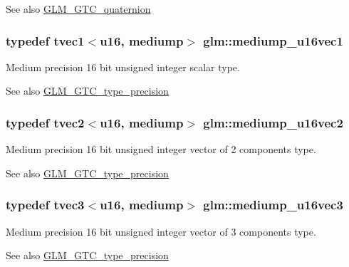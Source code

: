 \begin{DoxySeeAlso}{See also}
\hyperlink{group__gtc__quaternion}{G\+L\+M\+\_\+\+G\+T\+C\+\_\+quaternion} 
\end{DoxySeeAlso}
\hypertarget{namespaceglm_a425c296693be47183ee5fb01eca35cef}{}
\subsubsection[{mediump\+\_\+u16vec1}]{\setlength{\rightskip}{0pt plus 5cm}typedef tvec1$<${\bf u16}, mediump$>$ {\bf glm\+::mediump\+\_\+u16vec1}}\label{namespaceglm_a425c296693be47183ee5fb01eca35cef}
Medium precision 16 bit unsigned integer scalar type. \begin{DoxySeeAlso}{See also}
\hyperlink{group__gtc__type__precision}{G\+L\+M\+\_\+\+G\+T\+C\+\_\+type\+\_\+precision} 
\end{DoxySeeAlso}
\hypertarget{namespaceglm_aa9f152631d100f6a7573e1fde5503591}{}
\subsubsection[{mediump\+\_\+u16vec2}]{\setlength{\rightskip}{0pt plus 5cm}typedef tvec2$<${\bf u16}, mediump$>$ {\bf glm\+::mediump\+\_\+u16vec2}}\label{namespaceglm_aa9f152631d100f6a7573e1fde5503591}
Medium precision 16 bit unsigned integer vector of 2 components type. \begin{DoxySeeAlso}{See also}
\hyperlink{group__gtc__type__precision}{G\+L\+M\+\_\+\+G\+T\+C\+\_\+type\+\_\+precision} 
\end{DoxySeeAlso}
\hypertarget{namespaceglm_af9203271f50ffaf9c131e6e3230a13cf}{}
\subsubsection[{mediump\+\_\+u16vec3}]{\setlength{\rightskip}{0pt plus 5cm}typedef tvec3$<${\bf u16}, mediump$>$ {\bf glm\+::mediump\+\_\+u16vec3}}\label{namespaceglm_af9203271f50ffaf9c131e6e3230a13cf}
Medium precision 16 bit unsigned integer vector of 3 components type. \begin{DoxySeeAlso}{See also}
\hyperlink{group__gtc__type__precision}{G\+L\+M\+\_\+\+G\+T\+C\+\_\+type\+\_\+precision} 
\end{DoxySeeAlso}
\hypertarget{namespaceglm_a3621e92947a8c0c4cfb4b07052bfda63}{}

